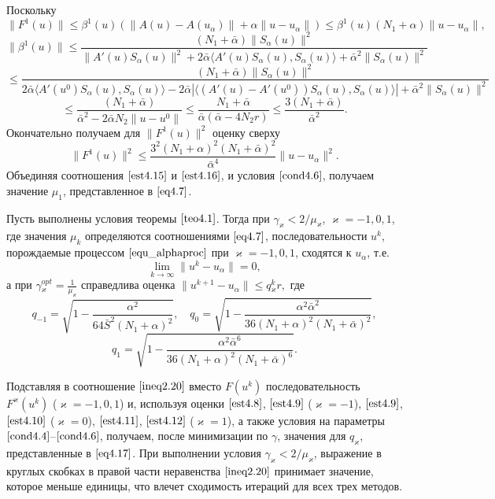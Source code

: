 Поскольку
$$\|F^1(u)\|\le\beta^1(u)(\|A(u)-A(u_\alpha)\|+\alpha\|u-u_\alpha\|)\le \beta^1(u)(N_1+\alpha)\|u-u_\alpha\|,$$ $$\|\beta^1(u)\|\le\frac{(N_1+\bar\alpha)\|S_\alpha(u)\|^2}{\|A'(u)S_\alpha(u)\|^2+2\bar\alpha\langle A'(u)S_\alpha(u), S_\alpha(u)\rangle+\bar\alpha^2\|S_\alpha(u)\|^2}$$ $$\le\frac{(N_1+\bar\alpha)\|S_\alpha(u)\|^2}{2\bar\alpha\langle A'(u^0)S_\alpha(u), S_\alpha(u)\rangle-2\bar\alpha|\langle (A'(u)-A'(u^0))S_\alpha(u), S_\alpha(u)\rangle|+\bar\alpha^2\|S_\alpha(u)\|^2}$$$$
\le\frac{(N_1+\bar\alpha)}{\bar\alpha^2-2\bar\alpha N_2\|u-u^0\|}\le\frac{N_1+\bar\alpha}{\bar\alpha(\bar\alpha - 4N_2 r)}\le\frac{3(N_1+\bar\alpha)}{\bar\alpha^2}.$$
Окончательно получаем для $\|F^1(u)\|^2$ оценку сверху
\begin{equation}\label{est4.16}
\|F^1(u)\|^2\le\frac{3^2(N_1+\alpha)^2(N_1+\bar\alpha)^2}{\bar\alpha^4}\|u-u_\alpha\|^2.
\end{equation}
Объединяя соотношения $\eqref{est4.15}$ и $\eqref{est4.16}$, и условия $\eqref{cond4.6}$, получаем значение $\mu_1$, представленное в $\eqref{eq4.7}$.
\begin{theorem}\label{teo4.3}
	Пусть выполнены условия теоремы $\ref{teo4.1}$. Тогда при $\gamma_\varkappa<2/\mu _\varkappa$, $\varkappa=-1,0,1$, где значения $\mu _k$ определяются соотношениями $\eqref{eq4.7}$, последовательности ${u^k}$, порождаемые процессом $\eqref{equ_alphaproc}$ при $\varkappa=-1,0,1$, сходятся к $u_\alpha$, т.е. $$\lim_{k\to\infty}\|u^k-u_\alpha\|=0,$$ а при $
	\gamma{_\varkappa^{opt}}=\frac{1}{\mu_\varkappa}$
	справедлива оценка $\|u^{k+1}-u_\alpha\|\le q{_\varkappa^k}r,$ где
	$$
	q_{-1}=\sqrt{1-\frac{\alpha^2}{64\bar S^2(N_1+\alpha)^2}}, \quad q_0=\sqrt{1-\frac{\alpha^2\bar\alpha^2}{36(N_1+\alpha)^2(N_1+\bar\alpha)^2}},$$
	\begin{equation}\label{eq4.17}
	q_1=\sqrt{1-\frac{\alpha^2\bar\alpha^6}{36(N_1+\alpha)^2(N_1+\bar\alpha)^6}}.
	\end{equation}
\end{theorem}
\proof Подставляя в соотношение $\eqref{ineq2.20}$ вместо $F(u^k)$ последовательность $F^\varkappa(u^k)$ ($\varkappa=-1,0,1$) и, используя оценки $\eqref{est4.8}$, $\eqref{est4.9}$ ($\varkappa=-1$), $\eqref{est4.9}$, $\eqref{est4.10}$ ($\varkappa=0$), $\eqref{est4.11}$, $\eqref{est4.12}$ ($\varkappa=1$), а также условия на параметры $\eqref{cond4.4}$--$\eqref{cond4.6}$, получаем, после минимизации по $\gamma$, значения для $q_\varkappa$, представленные в $\eqref{eq4.17}$. При выполнении условия $\gamma_\varkappa<2/\mu_\varkappa$, выражение в круглых скобках в правой части неравенства $\eqref{ineq2.20}$ принимает значение, которое меньше единицы, что влечет сходимость итераций для всех трех методов.

